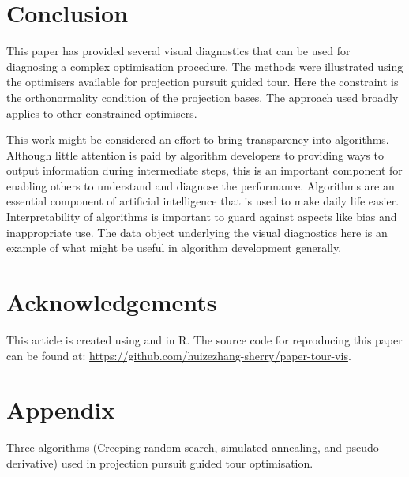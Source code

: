 \hypertarget{conclusion}{%
\section{Conclusion}\label{conclusion}}

This paper has provided several visual diagnostics that can be used for
diagnosing a complex optimisation procedure. The methods were
illustrated using the optimisers available for projection pursuit guided
tour. Here the constraint is the orthonormality condition of the
projection bases. The approach used broadly applies to other constrained
optimisers.

This work might be considered an effort to bring transparency into
algorithms. Although little attention is paid by algorithm developers to
providing ways to output information during intermediate steps, this is
an important component for enabling others to understand and diagnose
the performance. Algorithms are an essential component of artificial
intelligence that is used to make daily life easier. Interpretability of
algorithms is important to guard against aspects like bias and
inappropriate use. The data object underlying the visual diagnostics
here is an example of what might be useful in algorithm development
generally.

\hypertarget{acknowledgements}{%
\section{Acknowledgements}\label{acknowledgements}}

This article is created using  \citep{knitr} and
 \citep{rmarkdown} in R. The source code for
reproducing this paper can be found at:
\url{https://github.com/huizezhang-sherry/paper-tour-vis}.



\newpage

\hypertarget{appendix}{%
\section{Appendix}\label{appendix}}

Three algorithms (Creeping random search, simulated annealing, and
pseudo derivative) used in projection pursuit guided tour optimisation.

